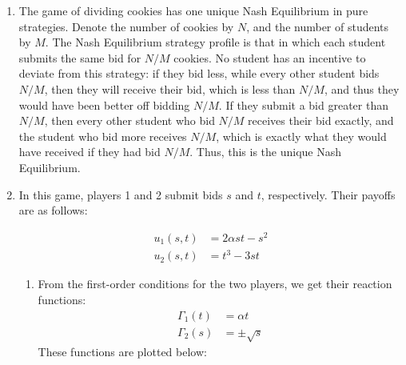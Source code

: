 \documentclass[11pt]{article}
\begin{document}
\begin{enumerate}
\begin{enumerate}
		\begin{table}[!htbp]
			\centering
			\setlength{\extrarowheight}{2pt}
			\begin{tabular}{cc|c|c|}
				& \multicolumn{1}{c}{} & \multicolumn{1}{c}{$L$}  & \multicolumn{1}{c}{$R$} \\\cline{3-4}
				 & $U$ & $(0,0)$ & $(1,1)$ \\\cline{3-4}
				& $D$ & $(0,0)$ & $(0,0)$ \\\cline{3-4}
			\end{tabular}
		\end{table}
		This game has two Nash Equilibria: $ (U,R) $ and $ (D,L) $. However, elimination of weakly dominated strategies will eliminate the first column and the second row, leaving only $ (U,R) $ as an equilibrium. 
		\end{enumerate}
	
	\item The game of dividing cookies has one unique Nash Equilibrium in pure strategies. Denote the number of cookies by $ N $, and the number of students by $ M $. The Nash Equilibrium strategy profile is that in which each student submits the same bid for $ N/M $ cookies. No student has an incentive to deviate from this strategy: if they bid less, while every other student bids $ N/M $, then they will receive their bid, which is less than $ N/M $, and thus they would have been better off bidding $ N/M $. If they submit a bid greater than $ N/M $, then every other student who bid $ N/M $ receives their bid exactly, and the student who bid more receives $ N/M $, which is exactly what they would have received if they had bid $ N/M $. Thus, this is the unique Nash Equilibrium. 
	
	\item In this game, players 1 and 2 submit bids $ s $ and $ t $, respectively. Their payoffs are as follows:
	
	\begin{align*}
	u_1(s,t) &= 2\alpha st - s^2 \\
	u_2(s,t) &= t^3 - 3st
	\end{align*}
	\begin{enumerate}
		\item From the first-order conditions for the two players, we get their reaction functions:
		\begin{align*}
		\Gamma_1(t) &= \alpha t \\
		\Gamma_2(s) &= \pm \sqrt{s} 
		\end{align*}
		These functions are plotted below:
		

\end{enumerate}
\end{enumerate}
\end{document}

